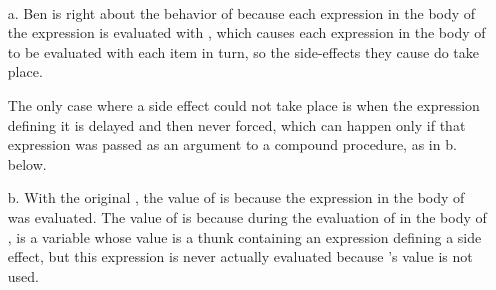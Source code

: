 \begin{exe}[4.30]
    \ \vspace{-20pt}
    \begin{itemize}
	\item[a.] Ben is right about the behavior of  because 
	    each expression in the body of the  expression is 
	    evaluated with , which causes each expression in the body 
	    of  to be evaluated with each item in turn, so the 
	    side-effects they cause do take place.

	    The only case where a side effect could not take place is when the 
	    expression defining it is delayed and then never forced, which can 
	    happen only if that expression was passed as an argument to 
	    a compound procedure, as in b. below.
	\item[b.] With the original , the value of
	     is  because the  expression in 
	    the body of  was evaluated. The value of  is 
	     because during the evaluation of  in the body of 
	    ,  is a variable whose value is a thunk containing 
	    an expression defining a side effect, but this expression is never 
	    actually evaluated because ’s value is not used.


\end{itemize}
\end{exe}
